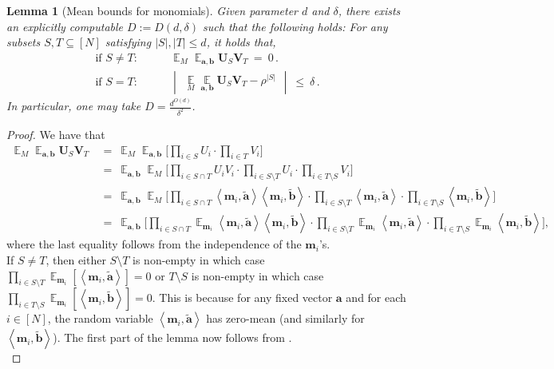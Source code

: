 \documentclass[11pt]{article}
\newcommand{\inangle}[1]{\left \langle #1 \right \rangle}
\newcommand{\inabs}[1]{\begin{vmatrix} #1 \end{vmatrix}}
\DeclareMathOperator*{\Ex}{\mathbb{E}}
\newcommand{\wtilde}[1]{\widetilde{#1}}
\newcommand{\ba}{{\bm a}}
\newcommand{\bb}{{\bm b}}
\newcommand{\m}{{\bm m}}
\newcommand{\bU}{\mathbf{U}}
\newcommand{\bV}{\mathbf{V}}
\newtheorem{lem}[theorem]{Lemma}
\begin{document}
\begin{lem}[Mean bounds for monomials]\label{lem:mean_bound_monomial}
	Given parameter $d$ and $\delta$, there exists an explicitly computable $D := D(d, \delta)$ such that the following holds:	
	For any subsets $S, T \subseteq [N]$ satisfying $|S|, |T| \le d$, it holds that,
	\begin{align*}
		\text{if } S \ne T : & \qquad \Ex_{M} \Ex_{\ba, \bb} \bU_S \bV_T ~=~ 0\,.\\
		\text{if } S = T : & \qquad \inabs{\Ex\limits_{M} \Ex\limits_{\ba, \bb} \bU_S \bV_T - \rho^{|S|}} ~\le~ \delta\,.
	\end{align*}
	In particular, one may take $D = \frac{d^{O(d)}}{\delta^2}$.
\end{lem}
\begin{proof}
	We have that
	\begin{align}\label{eq:mean_manip}
		\Ex_{M} \Ex_{\ba, \bb} \bU_S \bV_T &~=~ \Ex_{M} \Ex_{\ba, \bb} \bigg[ \prod_{i \in S} U_i  \cdot \prod_{i \in T} V_i \bigg]\nonumber\\ 
		&~=~ \Ex_{\ba, \bb} \Ex_{M} \bigg[  \prod_{i \in S \cap T} U_i V_i \cdot \prod_{i \in S \setminus T} U_i \cdot \prod_{i \in T \setminus S} V_i  \bigg]\nonumber\\ 
		&~=~ \Ex_{\ba, \bb} \Ex_{M} \bigg[  \prod_{i \in S \cap T} \inangle{\m_i, \wtilde{\ba}} \inangle{\m_i , \wtilde{\bb}} \cdot \prod_{i \in S \setminus T} \inangle{\m_i, \wtilde{\ba}} \cdot \prod_{i \in T \setminus S} \inangle{\m_i , \wtilde{\bb}} \bigg]\nonumber\\ 
		&~=~ \Ex_{\ba, \bb} \bigg[\prod_{i \in S \cap T} \Ex_{\m_i} \inangle{\m_i, \wtilde{\ba}} \inangle{\m_i , \wtilde{\bb}} \cdot \prod_{i \in S \setminus T} \Ex_{\m_i} \inangle{\m_i, \wtilde{\ba}} \cdot \prod_{i \in T \setminus S} \Ex_{\m_i} \inangle{\m_i , \wtilde{\bb}} \bigg],
	\end{align}
	where the last equality follows from the independence of the $\m_i$'s.\\
	
	\noindent If $S \neq T$, then either $S \setminus T$ is non-empty in which case $\prod_{i \in S \setminus T} \Ex_{\m_i}[\inangle{\m_i, \wtilde{\ba}}] = 0$ or $T \setminus S$ is non-empty in which case $\prod_{i \in T \setminus S} \Ex_{\m_i}[\inangle{\m_i , \wtilde{\bb}}] = 0$.  This is because for any fixed vector $\ba$ and for each $i \in [N]$, the random variable $\inangle{\m_i, \wtilde{\ba}}$ has zero-mean (and similarly for $\inangle{\m_i, \wtilde{\bb}}$). The first part of the lemma now follows from .\\
	

\end{proof}
\end{document}
